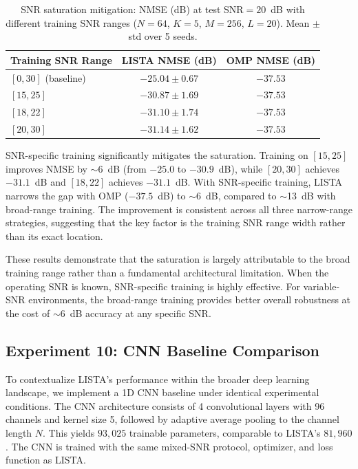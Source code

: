 \documentclass[a4paper,fleqn]{cas-sc}
\begin{document}
\begin{table}[width=.9\linewidth,cols=3,pos=!htbp]
\caption{SNR saturation mitigation: NMSE (dB) at test SNR$=20$~dB with different training SNR ranges ($N=64$, $K=5$, $M=256$, $L=20$). Mean $\pm$ std over 5 seeds.}\label{tab:snr_mitigation}
\begin{tabular*}{\tblwidth}{@{} LCC@{}}
\toprule
Training SNR Range & LISTA NMSE (dB) & OMP NMSE (dB) \\
\midrule
$[0, 30]$ (baseline) & $-25.04 \pm 0.67$ & $-37.53$ \\
$[15, 25]$           & $-30.87 \pm 1.69$ & $-37.53$ \\
$[18, 22]$           & $-31.10 \pm 1.74$ & $-37.53$ \\
$[20, 30]$           & $-31.14 \pm 1.62$ & $-37.53$ \\
\bottomrule
\end{tabular*}
\end{table}

SNR-specific training significantly mitigates the saturation. Training on $[15, 25]$ improves NMSE by $\sim$6~dB (from $-25.0$ to $-30.9$~dB), while $[20, 30]$ achieves $-31.1$~dB and $[18, 22]$ achieves $-31.1$~dB. With SNR-specific training, LISTA narrows the gap with OMP ($-37.5$~dB) to $\sim$6~dB, compared to $\sim$13~dB with broad-range training. The improvement is consistent across all three narrow-range strategies, suggesting that the key factor is the training SNR range width rather than its exact location.

These results demonstrate that the saturation is largely attributable to the broad training range rather than a fundamental architectural limitation. When the operating SNR is known, SNR-specific training is highly effective. For variable-SNR environments, the broad-range training provides better overall robustness at the cost of $\sim$6~dB accuracy at any specific SNR.

\subsection{Experiment 10: CNN Baseline Comparison}\label{sec:exp_cnn}

To contextualize LISTA's performance within the broader deep learning landscape, we implement a 1D CNN baseline under identical experimental conditions. The CNN architecture consists of 4 convolutional layers with 96 channels and kernel size 5, followed by adaptive average pooling to the channel length $N$. This yields $93{,}025$ trainable parameters, comparable to LISTA's $81{,}960$. The CNN is trained with the same mixed-SNR protocol, optimizer, and loss function as LISTA.
\end{document}
